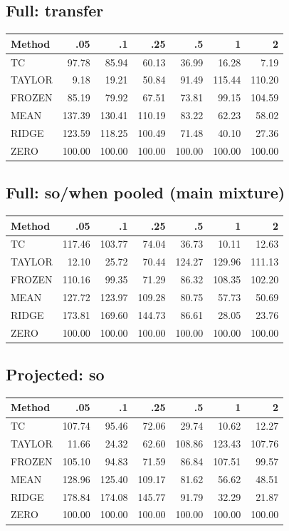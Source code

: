 \subsection{Full: transfer}
\begin{center}\small\begin{tabular}{lrrrrrr}
\toprule Method & .05 & .1 & .25 & .5 & 1 & 2\\
\midrule
TC & 97.78 & 85.94 & 60.13 & 36.99 & 16.28 & 7.19\\
TAYLOR & 9.18 & 19.21 & 50.84 & 91.49 & 115.44 & 110.20\\
FROZEN & 85.19 & 79.92 & 67.51 & 73.81 & 99.15 & 104.59\\
MEAN & 137.39 & 130.41 & 110.19 & 83.22 & 62.23 & 58.02\\
RIDGE & 123.59 & 118.25 & 100.49 & 71.48 & 40.10 & 27.36\\
ZERO & 100.00 & 100.00 & 100.00 & 100.00 & 100.00 & 100.00\\
\bottomrule\end{tabular}\end{center}
\subsection{Full: so/when pooled (main mixture)}
\begin{center}\small\begin{tabular}{lrrrrrr}
\toprule Method & .05 & .1 & .25 & .5 & 1 & 2\\
\midrule
TC & 117.46 & 103.77 & 74.04 & 36.73 & 10.11 & 12.63\\
TAYLOR & 12.10 & 25.72 & 70.44 & 124.27 & 129.96 & 111.13\\
FROZEN & 110.16 & 99.35 & 71.29 & 86.32 & 108.35 & 102.20\\
MEAN & 127.72 & 123.97 & 109.28 & 80.75 & 57.73 & 50.69\\
RIDGE & 173.81 & 169.60 & 144.73 & 86.61 & 28.05 & 23.76\\
ZERO & 100.00 & 100.00 & 100.00 & 100.00 & 100.00 & 100.00\\
\bottomrule\end{tabular}\end{center}
\subsection{Projected: so}
\begin{center}\small\begin{tabular}{lrrrrrr}
\toprule Method & .05 & .1 & .25 & .5 & 1 & 2\\
\midrule
TC & 107.74 & 95.46 & 72.06 & 29.74 & 10.62 & 12.27\\
TAYLOR & 11.66 & 24.32 & 62.60 & 108.86 & 123.43 & 107.76\\
FROZEN & 105.10 & 94.83 & 71.59 & 86.84 & 107.51 & 99.57\\
MEAN & 128.96 & 125.40 & 109.17 & 81.62 & 56.62 & 48.51\\
RIDGE & 178.84 & 174.08 & 145.77 & 91.79 & 32.29 & 21.87\\
ZERO & 100.00 & 100.00 & 100.00 & 100.00 & 100.00 & 100.00\\
\bottomrule\end{tabular}\end{center}
